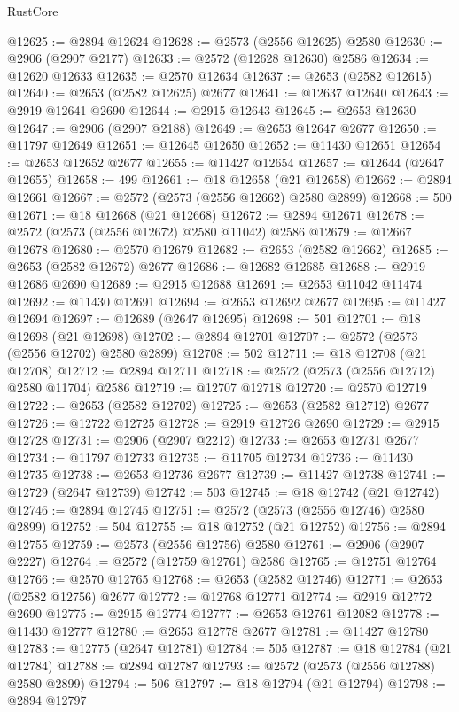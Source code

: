 \begin{lexlean}{RustCore}
\begin{coremodule}
@12625 := @2894 @12624
@12628 := @2573 (@2556 @12625) @2580
@12630 := @2906 (@2907 @2177)
@12633 := @2572 (@12628 @12630) @2586
@12634 := @12620 @12633
@12635 := @2570 @12634
@12637 := @2653 (@2582 @12615)
@12640 := @2653 (@2582 @12625) @2677
@12641 := @12637 @12640
@12643 := @2919 @12641 @2690
@12644 := @2915 @12643
@12645 := @2653 @12630
@12647 := @2906 (@2907 @2188)
@12649 := @2653 @12647 @2677
@12650 := @11797 @12649
@12651 := @12645 @12650
@12652 := @11430 @12651
@12654 := @2653 @12652 @2677
@12655 := @11427 @12654
@12657 := @12644 (@2647 @12655)
@12658 := 499
@12661 := @18 @12658 (@21 @12658)
@12662 := @2894 @12661
@12667 := @2572 (@2573 (@2556 @12662) @2580 @2899)
@12668 := 500
@12671 := @18 @12668 (@21 @12668)
@12672 := @2894 @12671
@12678 := @2572 (@2573 (@2556 @12672) @2580 @11042) @2586
@12679 := @12667 @12678
@12680 := @2570 @12679
@12682 := @2653 (@2582 @12662)
@12685 := @2653 (@2582 @12672) @2677
@12686 := @12682 @12685
@12688 := @2919 @12686 @2690
@12689 := @2915 @12688
@12691 := @2653 @11042 @11474
@12692 := @11430 @12691
@12694 := @2653 @12692 @2677
@12695 := @11427 @12694
@12697 := @12689 (@2647 @12695)
@12698 := 501
@12701 := @18 @12698 (@21 @12698)
@12702 := @2894 @12701
@12707 := @2572 (@2573 (@2556 @12702) @2580 @2899)
@12708 := 502
@12711 := @18 @12708 (@21 @12708)
@12712 := @2894 @12711
@12718 := @2572 (@2573 (@2556 @12712) @2580 @11704) @2586
@12719 := @12707 @12718
@12720 := @2570 @12719
@12722 := @2653 (@2582 @12702)
@12725 := @2653 (@2582 @12712) @2677
@12726 := @12722 @12725
@12728 := @2919 @12726 @2690
@12729 := @2915 @12728
@12731 := @2906 (@2907 @2212)
@12733 := @2653 @12731 @2677
@12734 := @11797 @12733
@12735 := @11705 @12734
@12736 := @11430 @12735
@12738 := @2653 @12736 @2677
@12739 := @11427 @12738
@12741 := @12729 (@2647 @12739)
@12742 := 503
@12745 := @18 @12742 (@21 @12742)
@12746 := @2894 @12745
@12751 := @2572 (@2573 (@2556 @12746) @2580 @2899)
@12752 := 504
@12755 := @18 @12752 (@21 @12752)
@12756 := @2894 @12755
@12759 := @2573 (@2556 @12756) @2580
@12761 := @2906 (@2907 @2227)
@12764 := @2572 (@12759 @12761) @2586
@12765 := @12751 @12764
@12766 := @2570 @12765
@12768 := @2653 (@2582 @12746)
@12771 := @2653 (@2582 @12756) @2677
@12772 := @12768 @12771
@12774 := @2919 @12772 @2690
@12775 := @2915 @12774
@12777 := @2653 @12761 @12082
@12778 := @11430 @12777
@12780 := @2653 @12778 @2677
@12781 := @11427 @12780
@12783 := @12775 (@2647 @12781)
@12784 := 505
@12787 := @18 @12784 (@21 @12784)
@12788 := @2894 @12787
@12793 := @2572 (@2573 (@2556 @12788) @2580 @2899)
@12794 := 506
@12797 := @18 @12794 (@21 @12794)
@12798 := @2894 @12797

\end{coremodule}
\end{lexlean}
